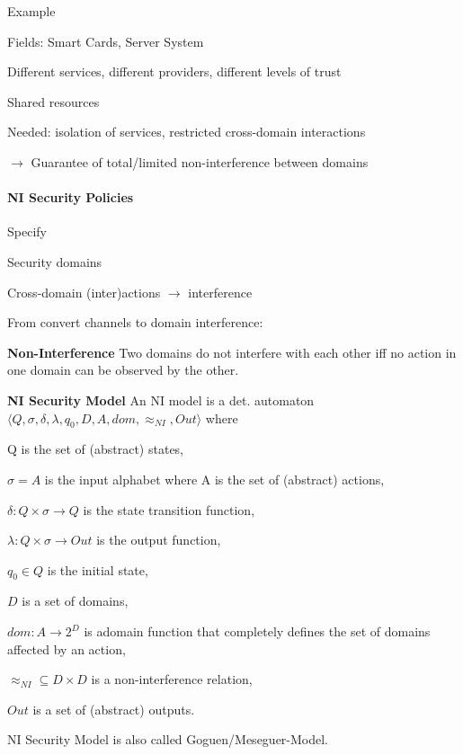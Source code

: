 \documentclass[a4paper]{article}
\renewcommand{\note}[2]{\begin{noteBox} \textbf{#1} #2 \end{noteBox}}
\begin{document}
\begin{multicols}{3}
    Example
    \begin{itemize*}
        \item Fields: Smart Cards, Server System
        \item Different services, different providers, different levels of trust
        \item Shared resources
        \item Needed: isolation of services, restricted cross-domain interactions
        \item[$\rightarrow$] Guarantee of total/limited non-interference between domains
    \end{itemize*}

    \paragraph{NI Security Policies}
    Specify
    \begin{itemize*}
        \item Security domains
        \item Cross-domain (inter)actions $\rightarrow$ interference
    \end{itemize*}
    From convert channels to domain interference:
    \note{Non-Interference}{Two domains do not interfere with each other iff no action in one domain can be observed by the other.}

    \note{NI Security Model}{An NI model is a det. automaton $\langle Q,\sigma,\delta,\lambda,q_0,D,A,dom,\approx_{NI},Out\rangle$ where
        \begin{itemize*}
            \item Q is the set of (abstract) states,
            \item $\sigma=A$ is the input alphabet where A is the set of (abstract) actions,
            \item $\delta:Q\times\sigma\rightarrow Q$ is the state transition function,
            \item $\lambda:Q\times\sigma\rightarrow Out$ is the output function,
            \item $q_0\in Q$ is the initial state,
            \item $D$ is a set of domains,
            \item $dom:A\rightarrow 2^D$ is adomain function that completely defines the set of domains affected by an action,
            \item $\approx_{NI}\subseteq D\times D$ is a non-interference relation,
            \item $Out$ is a set of (abstract) outputs.
        \end{itemize*}
        NI Security Model is also called Goguen/Meseguer-Model.
    }


\end{multicols}
\end{document}
